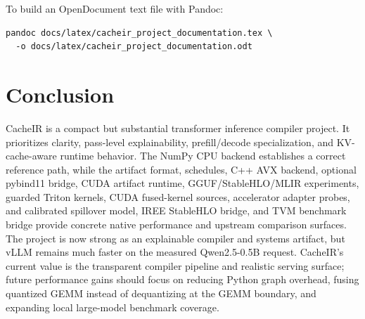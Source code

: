 \documentclass[11pt]{article}
\begin{document}
To build an OpenDocument text file with Pandoc:

\begin{lstlisting}
pandoc docs/latex/cacheir_project_documentation.tex \
  -o docs/latex/cacheir_project_documentation.odt
\end{lstlisting}

\section{Conclusion}

CacheIR is a compact but substantial transformer inference compiler project. It
prioritizes clarity, pass-level explainability, prefill/decode specialization,
and KV-cache-aware runtime behavior. The NumPy CPU backend establishes a correct
reference path, while the artifact format, schedules, C++ AVX backend, optional
pybind11 bridge, CUDA artifact runtime, GGUF/StableHLO/MLIR experiments, guarded
Triton kernels, CUDA fused-kernel sources, accelerator adapter probes, and
calibrated spillover model, IREE StableHLO bridge, and TVM benchmark bridge
provide concrete native performance and upstream comparison surfaces. The
project is now strong as an explainable compiler and systems artifact, but
vLLM remains much faster on the measured Qwen2.5-0.5B request. CacheIR's current
value is the transparent compiler pipeline and realistic serving surface; future
performance gains should focus on reducing Python graph overhead, fusing
quantized GEMM instead of dequantizing at the GEMM boundary, and expanding local
large-model benchmark coverage.
\end{document}
